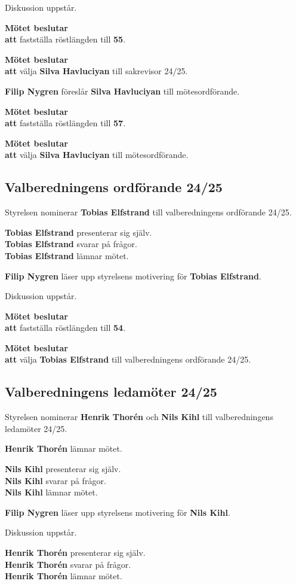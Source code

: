 \documentclass{datateknologsektionen-document}
\newcommand{\ind}{\hspace*{2em}}
\newcommand{\motetbeslutar}{\textbf{Mötet beslutar}}
\newcommand{\att}{\\\ind\textbf{att}}
\newcommand{\rostlangd}[1]{\motetbeslutar\att{} fastställa röstlängden till \textbf{#1}.}
\begin{document}
Diskussion uppstår.

\rostlangd{55}

\motetbeslutar\att{} välja \textbf{Silva Havluciyan} till sakrevisor 24/25.

\textbf{Filip Nygren} föreslår \textbf{Silva Havluciyan} till mötesordförande.

\rostlangd{57}

\motetbeslutar\att{} välja \textbf{Silva Havluciyan} till mötesordförande.

\subsection{Valberedningens ordförande 24/25}

Styrelsen nominerar \textbf{Tobias Elfstrand} till valberedningens ordförande 24/25.

\textbf{Tobias Elfstrand} presenterar sig själv.\\
\textbf{Tobias Elfstrand} svarar på frågor.\\
\textbf{Tobias Elfstrand} lämnar mötet.

\textbf{Filip Nygren} läser upp styrelsens motivering för \textbf{Tobias Elfstrand}.

Diskussion uppstår.

\rostlangd{54}

\motetbeslutar\att{} välja \textbf{Tobias Elfstrand} till valberedningens ordförande 24/25.

\subsection{Valberedningens ledamöter 24/25}

Styrelsen nominerar \textbf{Henrik Thorén} och \textbf{Nils Kihl} till valberedningens ledamöter 24/25.

\textbf{Henrik Thorén} lämnar mötet.

\textbf{Nils Kihl} presenterar sig själv.\\
\textbf{Nils Kihl} svarar på frågor.\\
\textbf{Nils Kihl} lämnar mötet.

\textbf{Filip Nygren} läser upp styrelsens motivering för \textbf{Nils Kihl}.

Diskussion uppstår.

\textbf{Henrik Thorén} presenterar sig själv.\\
\textbf{Henrik Thorén} svarar på frågor.\\
\textbf{Henrik Thorén} lämnar mötet.
\end{document}
